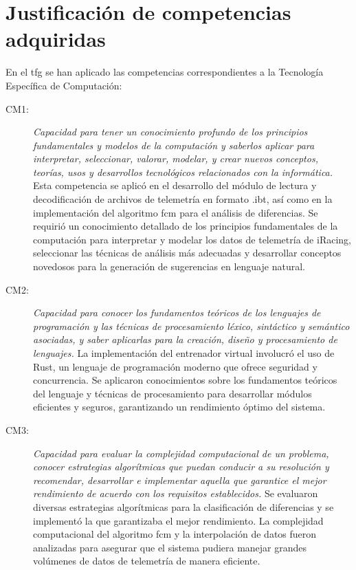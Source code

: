 \section{Justificación de competencias adquiridas}
En el \ac{tfg} se han aplicado las competencias correspondientes a la Tecnología Específica de Computación:

\begin{description}
\item[CM1:] \emph{Capacidad para tener un conocimiento profundo de los principios fundamentales y modelos de la computación y saberlos aplicar para interpretar, seleccionar, valorar, modelar, y crear nuevos conceptos, teorías, usos y desarrollos tecnológicos relacionados con la informática.} Esta competencia se aplicó en el desarrollo del módulo de lectura y decodificación de archivos de telemetría en formato .ibt, así como en la implementación del algoritmo \ac{fcm} para el análisis de diferencias. Se requirió un conocimiento detallado de los principios fundamentales de la computación para interpretar y modelar los datos de telemetría de iRacing, seleccionar las técnicas de análisis más adecuadas y desarrollar conceptos novedosos para la generación de sugerencias en lenguaje natural.

\item[CM2:] \emph{Capacidad para conocer los fundamentos teóricos de los lenguajes de programación y las técnicas de procesamiento léxico, sintáctico y semántico asociadas, y saber aplicarlas para la creación, diseño y procesamiento de lenguajes.} La implementación del entrenador virtual involucró el uso de Rust, un lenguaje de programación moderno que ofrece seguridad y concurrencia. Se aplicaron conocimientos sobre los fundamentos teóricos del lenguaje y técnicas de procesamiento para desarrollar módulos eficientes y seguros, garantizando un rendimiento óptimo del sistema.

\item[CM3:] \emph{Capacidad para evaluar la complejidad computacional de un problema, conocer estrategias algorítmicas que puedan conducir a su resolución y recomendar, desarrollar e implementar aquella que garantice el mejor rendimiento de acuerdo con los requisitos establecidos.} Se evaluaron diversas estrategias algorítmicas para la clasificación de diferencias y se implementó la que garantizaba el mejor rendimiento. La complejidad computacional del algoritmo \ac{fcm} y la interpolación de datos fueron analizadas para asegurar que el sistema pudiera manejar grandes volúmenes de datos de telemetría de manera eficiente.


\end{description}

